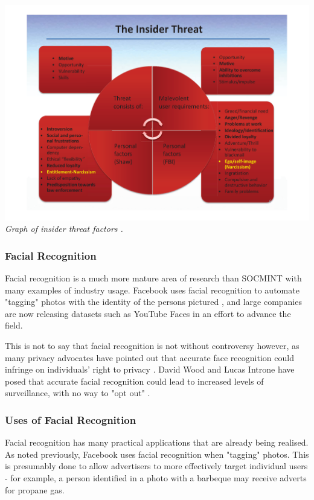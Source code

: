 \documentclass[12pt]{article}
\begin{document}
\begin{center}
\includegraphics[width=\linewidth]{res/threat_graph.png}
\textit{Graph of insider threat factors \citep{behaviourdetection}.}
\end{center}

\subsubsection{Facial Recognition}
Facial recognition is a much more mature area of research than SOCMINT with many examples of industry usage. Facebook uses facial recognition to automate "tagging" photos with the identity of the persons pictured \citep{facebookfacialrecog}, and large companies are now releasing datasets such as YouTube Faces \citep{faceregiondescriptors} in an effort to advance the field.

This is not to say that facial recognition is not without controversy however, as many privacy advocates have pointed out that accurate face recognition could infringe on individuals' right to privacy \citep{gchqmasssurveillance}. David Wood and Lucas Introne have posed that accurate facial recognition could lead to increased levels of surveillance, with no way to "opt out" \citep{facialrecogpolitics}\citep{facialrecogsecurityvsprivacy}.

\subsubsection{Uses of Facial Recognition}
Facial recognition has many practical applications that are already being realised. As noted previously, Facebook uses facial recognition when "tagging" photos. This is presumably done to allow advertisers to more effectively target individual users - for example, a person identified in a photo with a barbeque may receive adverts for propane gas.
\end{document}
